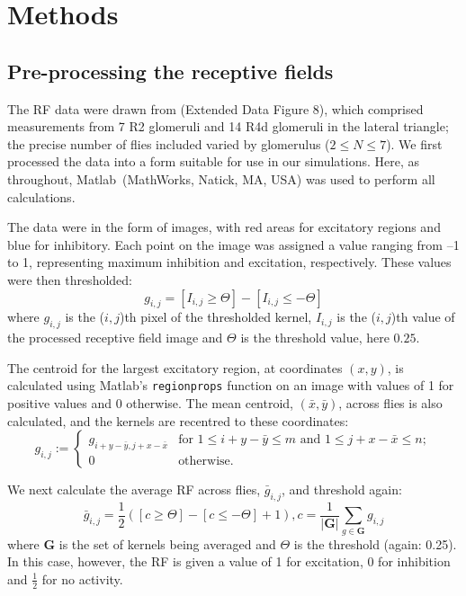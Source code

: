 
\section{Methods}
\subsection{Pre-processing the receptive fields}
\label{sec:methods:preprocessing}
The \ac{RF} data were drawn from  (Extended Data Figure 8), which comprised measurements from 7 R2 glomeruli and 14 R4d glomeruli in the lateral triangle; the precise number of flies included varied by glomerulus ($2\le N\le 7$).
We first processed the data into a form suitable for use in our simulations.
Here, as throughout, Matlab\textregistered\ (MathWorks, Natick, MA, USA) was used to perform all calculations.

The data were in the form of images, with red areas for excitatory regions and blue for inhibitory.
Each point on the image was assigned a value ranging from --1 to 1, representing maximum inhibition and excitation, respectively.
These values were then thresholded:
$$
g_{i,j} = [I_{i,j} \ge \Theta] - [I_{i,j} \le -\Theta]
$$
where $g_{i,j}$ is the ($i,j$)th pixel of the thresholded kernel, $I_{i,j}$ is the ($i,j$)th value of the processed receptive field image and $\Theta$ is the threshold value, here $0.25$.

The centroid for the largest excitatory region, at coordinates $(x,y)$, is calculated using Matlab's \texttt{regionprops} function on an image with values of 1 for positive values and 0 otherwise.
The mean centroid, $(\bar{x},\bar{y})$, across flies is also calculated, and the kernels are recentred to these coordinates:
$$
g_{i,j} := \left\{ \begin{array}{ll} g_{i+y-\bar{y},j+x-\bar{x}} & \mbox{for } 1\le i+y-\bar{y}\le m \mbox{ and } 1\le j+x-\bar{x}\le n;\\
0 & \mbox{otherwise.} \end{array} \right.
$$

We next calculate the average \ac{RF} across flies, $\bar{g}_{i,j}$, and threshold again:
$$
\bar{g}_{i,j} = \frac{1}{2}([c \ge \Theta] - [c \le -\Theta] + 1), c = \frac{1}{|\bm{G}|}\sum\limits_{g \in \bm{G}} g_{i,j}
$$
where $\bm{G}$ is the set of kernels being averaged and $\Theta$ is the threshold (again: 0.25).
In this case, however, the \ac{RF} is given a value of 1 for excitation, 0 for inhibition and $\frac{1}{2}$ for no activity.

